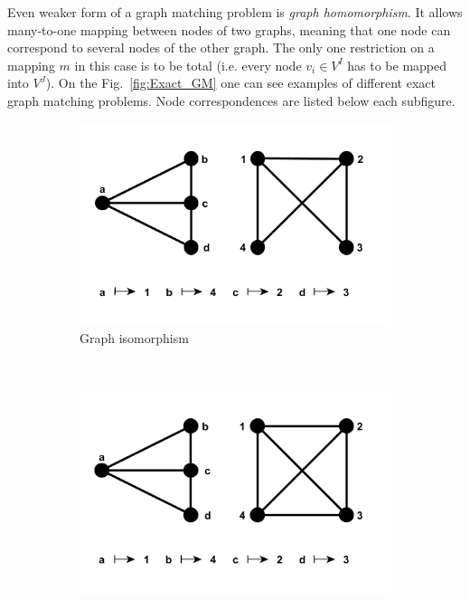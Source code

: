 Even weaker form of a graph matching problem is \emph{graph homomorphism}. It allows many-to-one mapping between nodes of two graphs, meaning that one node can correspond to several nodes of the other graph. The only one restriction on a mapping $m$ in this case is to be total (i.e. every node $v_i\in V^I$ has to be mapped into $V^J$).
On the Fig.~\ref{fig:Exact_GM} one can see examples of different exact graph matching problems. Node correspondences are listed below each subfigure.
\begin{figure}[h!]
    \centering
    \begin{subfigure}[b]{0.3\textwidth}
        \includegraphics[width=\textwidth]{chapter1/fig/GI}
        \caption{Graph isomorphism}
        \label{fig:GI}
    \end{subfigure}
    ~
    \begin{subfigure}[b]{0.3\textwidth}
        \includegraphics[width=\textwidth]{chapter1/fig/monomorphism}

\end{subfigure}
\end{figure}
